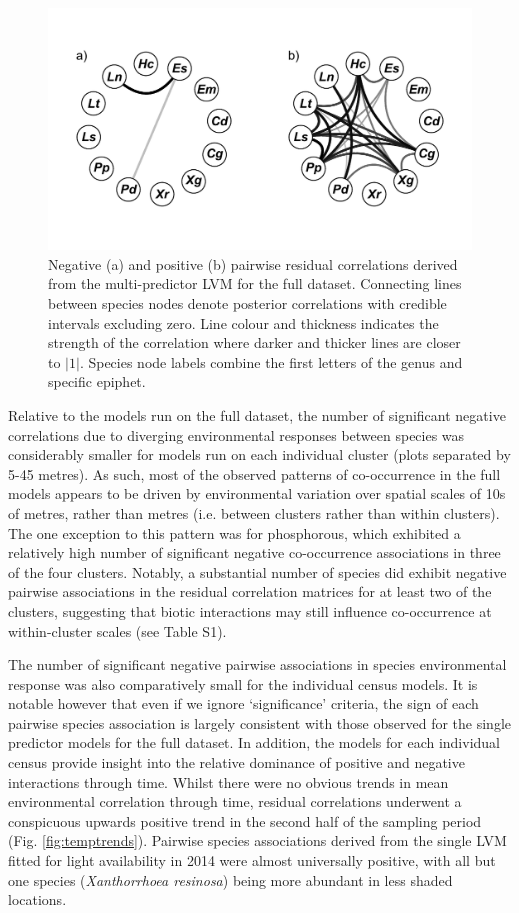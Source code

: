 \begin{figure}[H]
\centering
\includegraphics[width=0.7\linewidth]{Chapter5/Figures/multiresid}
\caption{Negative (a) and positive (b) pairwise residual correlations derived from the multi-predictor LVM for the full dataset. Connecting lines between species nodes denote posterior correlations with credible intervals excluding zero. Line colour and thickness indicates the strength of the correlation where darker and thicker lines are closer to $|1|$. Species node labels combine the first letters of the genus and specific epiphet.}
\label{fig:multiresid}
\end{figure}



Relative to the models run on the full dataset, the number of significant negative correlations due to diverging environmental responses between species was considerably smaller for models run on each individual cluster (plots separated by 5-45 metres). As such, most of the observed patterns of co-occurrence in the full models appears to be driven by environmental variation over spatial scales of 10s of metres, rather than metres (i.e. between clusters rather than within clusters). The one exception to this pattern was for phosphorous, which exhibited a relatively high number of significant negative co-occurrence associations in three of the four clusters. Notably, a substantial number of species did exhibit negative pairwise associations in the residual correlation matrices for at least two of the clusters, suggesting that biotic interactions may still influence co-occurrence at within-cluster scales (see Table S1).

The number of significant negative pairwise associations in species environmental response was also comparatively small for the individual census models. It is notable however that even if we ignore `significance' criteria, the sign of each pairwise species association is largely consistent with those observed for the single predictor models for the full dataset. In addition, the models for each individual census provide insight into the relative dominance of positive and negative interactions through time. Whilst there were no obvious trends in mean environmental correlation through time, residual correlations underwent a conspicuous upwards positive trend in the second half of the sampling period (Fig. \ref{fig:temptrends}). Pairwise species associations derived from the single LVM fitted for light availability in 2014 were almost universally positive, with all but one species (\textit{Xanthorrhoea resinosa}) being more abundant in less shaded locations. 

